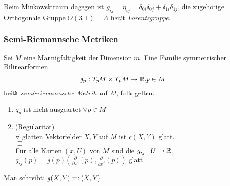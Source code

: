 \documentclass{skript}
\begin{document}
Beim Minkowskiraum dagegen ist $g_{ij} = \eta_{ij} =
\delta_{0i}\delta_{0j} + \delta_{1i}\delta_{1j}$, die zugehörige Orthogonale
Gruppe $O(3,1) = \Lambda$ heißt \emph{Lorentzgruppe}.

\subsubsection{Semi-Riemannsche Metriken}
\begin{dfn}
  Sei $M$ eine Mannigfaltigkeit der Dimension $m$. Eine Familie symmetrischer
  Bilinearformen
  \begin{align*}
    g_p : T_pM\times T_pM\to \mathbb{R}, & p\in M
  \end{align*}
  heißt \emph{semi-riemannsche Metrik} auf $M$, falls gelten:
  \begin{enumerate}
    \item $g_p$ ist nicht ausgeartet $\forall p\in M$
    \item (Regularität)\\
      $\forall$ glatten Vektorfelder $X,Y$ auf $M$ ist $g(X,Y)$ glatt. \\
      $\Equiv$\\
      Für alle Karten $(x,U)$ von $M$ sind die $g_{ij}:U\to \mathbb{R}$,
      $g_{ij}(p) = g(p)\left( \frac{\partial}{\partial x^i}(p),
      \frac{\partial}{\partial x^j}(p) \right)$ glatt
  \end{enumerate}
  Man schreibt: $g(X,Y) =: \sprod{X,Y}$
\end{dfn}
\end{document}
